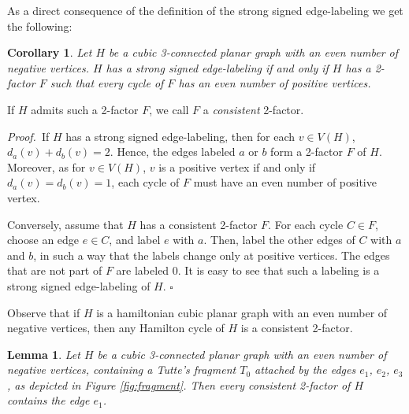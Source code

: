 \documentclass[12pt]{article}
\newtheorem{corollary}{Corollary}
\newtheorem{lemma}{Lemma}
\newcommand{\pf}{{{\it Proof.}\ }}
\newcommand{\ep}{\hfill$\square$}
\begin{document}
As a direct consequence of the definition of the strong signed edge-labeling we get the following: 

\begin{corollary}
Let $H$ be a cubic 3-connected planar graph with an even number of negative vertices. $H$ has a strong signed edge-labeling if and only if $H$ has a 2-factor $F$ such that every cycle of $F$ has an even number of positive vertices. 
\end{corollary}

If $H$ admits such a 2-factor $F$, we call $F$ a \emph{consistent} 2-factor. 

\pf If $H$ has a strong signed edge-labeling, then for each $v\in V(H)$, $d_a(v)+d_b(v) = 2$. Hence, the edges labeled $a$ or $b$ form a 2-factor $F$ of $H$. Moreover, as for $v\in V(H)$, $v$ is a positive vertex if and only if $d_a(v)=d_b(v)=1$, each cycle of $F$ must have an even number of positive vertex.

Conversely, assume that $H$ has a consistent 2-factor $F$. For each cycle $C\in F$, choose an edge $e \in C$, and label $e$ with $a$. Then, label the other edges of $C$ with $a$ and $b$, in such a way that the labels change only at positive vertices. The edges that are not part of $F$ are labeled $0$. It is easy to see that such a labeling is a strong signed edge-labeling of $H$.
\ep

Observe that if $H$ is a hamiltonian cubic planar graph with an even number of negative vertices, then any Hamilton cycle of $H$ is a consistent 2-factor.





\begin{lemma}
    Let $H$ be a cubic 3-connected planar graph with an even number of negative vertices, containing a Tutte's fragment $T_0$ attached by the edges $e_1$, $e_2$, $e_3$, as depicted in Figure \ref{fig:fragment}. Then every consistent 2-factor of $H$ contains the edge $e_1$.
\label{lemma:fragment}
\end{lemma}
\end{document}
